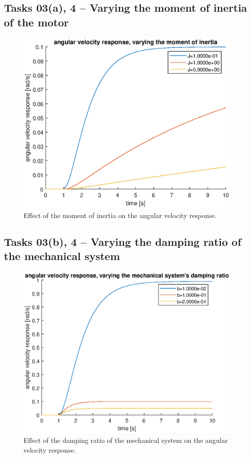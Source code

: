 \documentclass[12pt]{article}
\begin{document}
\subsection{Tasks 03(a), 4 -- Varying the moment of inertia of the motor}

\begin{figure}
    \centering
    \includegraphics[width=\linewidth]{img/task03a_varying_moment_of_inertia.eps}
    \caption{Effect of the moment of inertia on the angular velocity response.}
    \label{fig:moment of inertia on angular velocity}
\end{figure}

\subsection{Tasks 03(b), 4 -- Varying the damping ratio of the mechanical system}

\begin{figure}
    \centering
    \includegraphics[width=\linewidth]{img/task03b_varying_mechanical_sys_damping_ratio.eps}
    \caption{Effect of the damping ratio of the mechanical system on the angular velocity response.}
    \label{fig:mechanical system damping ratio on angular velocity}
\end{figure}
\end{document}
